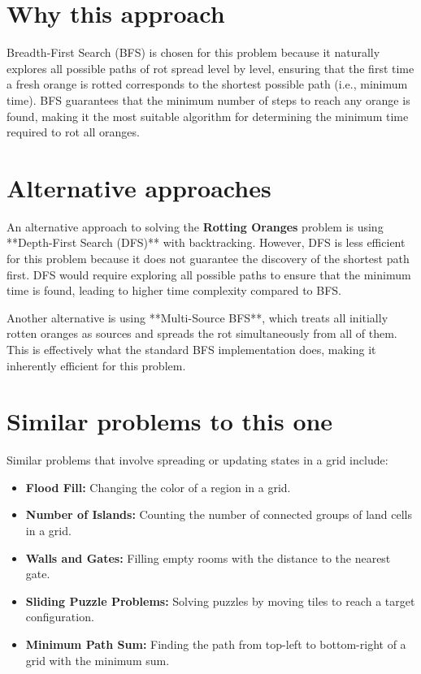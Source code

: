 \section*{Why this approach}

Breadth-First Search (BFS) is chosen for this problem because it naturally explores all possible paths of rot spread level by level, ensuring that the first time a fresh orange is rotted corresponds to the shortest possible path (i.e., minimum time). BFS guarantees that the minimum number of steps to reach any orange is found, making it the most suitable algorithm for determining the minimum time required to rot all oranges.

\section*{Alternative approaches}

An alternative approach to solving the \textbf{Rotting Oranges} problem is using **Depth-First Search (DFS)** with backtracking. However, DFS is less efficient for this problem because it does not guarantee the discovery of the shortest path first. DFS would require exploring all possible paths to ensure that the minimum time is found, leading to higher time complexity compared to BFS.

Another alternative is using **Multi-Source BFS**, which treats all initially rotten oranges as sources and spreads the rot simultaneously from all of them. This is effectively what the standard BFS implementation does, making it inherently efficient for this problem.

\section*{Similar problems to this one}

Similar problems that involve spreading or updating states in a grid include:
\begin{itemize}
    \item \textbf{Flood Fill:} Changing the color of a region in a grid.
    
    \item \textbf{Number of Islands:} Counting the number of connected groups of land cells in a grid.
    
    \item \textbf{Walls and Gates:} Filling empty rooms with the distance to the nearest gate.
    
    \item \textbf{Sliding Puzzle Problems:} Solving puzzles by moving tiles to reach a target configuration.
    
    \item \textbf{Minimum Path Sum:} Finding the path from top-left to bottom-right of a grid with the minimum sum.
\end{itemize}

